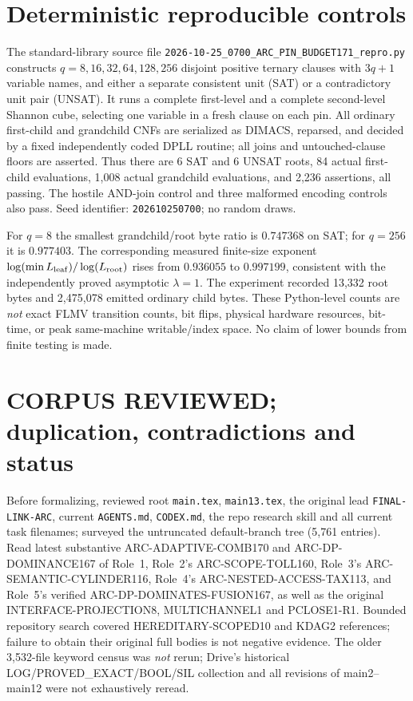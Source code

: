 \documentclass[11pt]{article}
\begin{document}
\section{Deterministic reproducible controls}
The standard-library source file \texttt{2026-10-25\_0700\_ARC\_PIN\_BUDGET171\_repro.py} constructs $q=8,16,32,64,128,256$ disjoint positive ternary clauses with $3q+1$ variable names, and either a separate consistent unit (SAT) or a contradictory unit pair (UNSAT). It runs a complete first-level and a complete second-level Shannon cube, selecting one variable in a fresh clause on each pin. All ordinary first-child and grandchild CNFs are serialized as DIMACS, reparsed, and decided by a fixed independently coded DPLL routine; all joins and untouched-clause floors are asserted. Thus there are 6 SAT and 6 UNSAT roots, 84 actual first-child evaluations, 1,008 actual grandchild evaluations, and 2,236 assertions, all passing. The hostile AND-join control and three malformed encoding controls also pass. Seed identifier: \texttt{202610250700}; no random draws.

For $q=8$ the smallest grandchild/root byte ratio is $0.747368$ on SAT; for $q=256$ it is $0.977403$. The corresponding measured finite-size exponent $\log(\min L_{\rm leaf})/\log(L_{\rm root})$ rises from $0.936055$ to $0.997199$, consistent with the independently proved asymptotic $\lambda=1$. The experiment recorded 13,332 root bytes and 2,475,078 emitted ordinary child bytes. These Python-level counts are \emph{not} exact FLMV transition counts, bit flips, physical hardware resources, bit-time, or peak same-machine writable/index space. No claim of lower bounds from finite testing is made.

\section{CORPUS REVIEWED; duplication, contradictions and status}
Before formalizing, reviewed root \texttt{main.tex}, \texttt{main13.tex}, the original lead \texttt{FINAL-LINK-ARC}, current \texttt{AGENTS.md}, \texttt{CODEX.md}, the repo research skill and all current task filenames; surveyed the untruncated default-branch tree (5,761 entries). Read latest substantive ARC-ADAPTIVE-COMB170 and ARC-DP-DOMINANCE167 of Role~1, Role~2's ARC-SCOPE-TOLL160, Role~3's ARC-SEMANTIC-CYLINDER116, Role~4's ARC-NESTED-ACCESS-TAX113, and Role~5's verified ARC-DP-DOMINATES-FUSION167, as well as the original INTERFACE-PROJECTION8, MULTICHANNEL1 and PCLOSE1-R1. Bounded repository search covered HEREDITARY-SCOPED10 and KDAG2 references; failure to obtain their original full bodies is not negative evidence. The older 3,532-file keyword census was \emph{not} rerun; Drive's historical LOG/PROVED\_EXACT/BOOL/SIL collection and all revisions of main2--main12 were not exhaustively reread.
\end{document}
